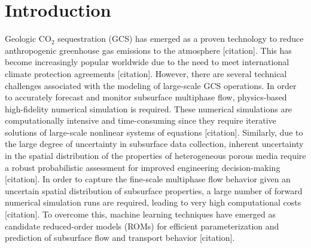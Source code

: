 \documentclass[default,iicol]{sn-jnl}
\begin{document}

\maketitle

\section{Introduction}\label{sec1_intro}

Geologic CO$_2$ sequestration (GCS) has emerged as a proven technology to reduce anthropogenic greenhouse gas emissions to the atmosphere [citation]. This has become increasingly popular worldwide due to the need to meet international climate protection agreements [citation]. However, there are several technical challenges associated with the modeling of large-scale GCS operations. In order to accurately forecast and monitor subsurface multiphase flow, physics-based high-fidelity numerical simulation is required. These numerical simulations are computationally intensive and time-consuming since they require iterative solutions of large-scale nonlinear systems of equations [citation]. Similarly, due to the large degree of uncertainty in subsurface data collection, inherent uncertainty in the spatial distribution of the properties of heterogeneous porous media require a robust probabilistic assessment for improved engineering decision-making [citation]. In order to capture the fine-scale multiphase flow behavior given an uncertain spatial distribution of subsurface properties, a large number of forward numerical simulation runs are required, leading to very high computational costs [citation]. To overcome this, machine learning techniques have emerged as candidate reduced-order models (ROMs) for efficient parameterization and prediction of subsurface flow and transport behavior [citation].
\end{document}

